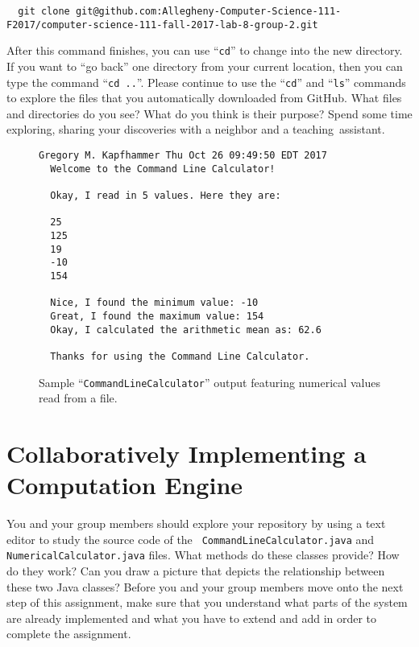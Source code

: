 \documentclass[11pt]{article}
\newcommand{\command}[1]{``\lstinline{#1}''}
\newcommand{\step}[1]{``{#1}''}
\begin{document}
\begin{lstlisting}
  git clone git@github.com:Allegheny-Computer-Science-111-F2017/computer-science-111-fall-2017-lab-8-group-2.git
\end{lstlisting}

After this command finishes, you can use \command{cd} to change into the new directory. If you want to \step{go back}
one directory from your current location, then you can type the command \command{cd ..}. Please continue to use the
\command{cd} and \command{ls} commands to explore the files that you automatically downloaded from GitHub. What files
and directories do you see? What do you think is their purpose? Spend some time exploring, sharing your discoveries with
a neighbor and a \mbox{teaching assistant}.

\begin{figure}[tb]
\begin{Verbatim}[commandchars=\\\{\}]
  Gregory M. Kapfhammer Thu Oct 26 09:49:50 EDT 2017
  Welcome to the Command Line Calculator!

  Okay, I read in 5 values. Here they are:

  25
  125
  19
  -10
  154

  Nice, I found the minimum value: -10
  Great, I found the maximum value: 154
  Okay, I calculated the arithmetic mean as: 62.6

  Thanks for using the Command Line Calculator.
\end{Verbatim}
\vspace*{-.1in}
\caption{Sample ``{\tt CommandLineCalculator}'' output featuring numerical values read from a file.}
\label{fig:output}
\end{figure}

\section*{Collaboratively Implementing a Computation Engine}

You and your group members should explore your repository by using a text editor to study the source code of the {\tt
CommandLineCalculator.java} and {\tt NumericalCalculator.java} files. What methods do these classes provide? How do they
work? Can you draw a picture that depicts the relationship between these two Java classes? Before you and your group
members move onto the next step of this assignment, make sure that you understand what parts of the system are already
implemented and what you have to extend and add in order to complete the assignment.
\end{document}

